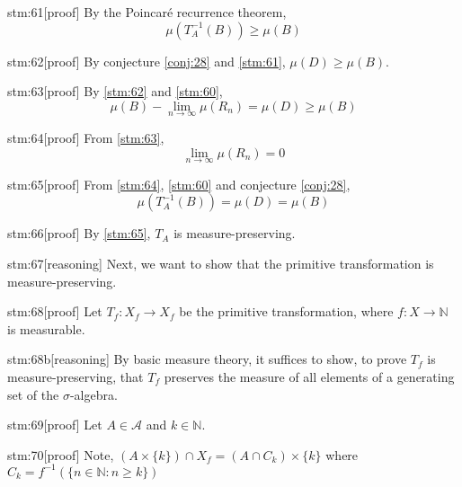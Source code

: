 \begin{stm}{stm:61}[proof]
By the Poincaré recurrence theorem, 
\[
\mu(T_A^{-1}(B)) \ge \mu(B)
\]
\end{stm}

\begin{stm}{stm:62}[proof]
By conjecture \ref{conj:28} and \ref{stm:61}, $\mu(D) \ge \mu(B)$.
\end{stm}

\begin{stm}{stm:63}[proof]
By \ref{stm:62} and \ref{stm:60}, 
\[
\mu(B) - \lim_{n \to \infty} \mu(R_n) = \mu(D) \ge \mu(B)
\]
\end{stm}

\begin{stm}{stm:64}[proof]
From \ref{stm:63}, 
\[
\lim_{n \to \infty} \mu(R_n) = 0
\]
\end{stm}

\begin{stm}{stm:65}[proof]
From \ref{stm:64}, \ref{stm:60} and conjecture \ref{conj:28},
\[
\mu(T_A^{-1}(B)) = \mu(D) = \mu(B)
\]
\end{stm}

\begin{stm}{stm:66}[proof]
By \ref{stm:65}, $T_A$ is measure-preserving.
\end{stm}

\begin{stm}{stm:67}[reasoning]
Next, we want to show that the primitive transformation is measure-preserving.
\end{stm}

\begin{stm}{stm:68}[proof]
Let $T_f : X_f \to X_f$ be the primitive transformation, where $f : X \to \mathbb{N}$ is measurable.
\end{stm}

\begin{stm}{stm:68b}[reasoning]
By basic measure theory, it suffices to show, to prove $T_f$ is measure-preserving, that $T_f$ preserves the measure of all elements of a generating set of the $\sigma$-algebra.
\end{stm}

\begin{stm}{stm:69}[proof]
Let $A \in \mathcal{A}$ and $k \in \mathbb{N}$.
\end{stm}

\begin{stm}{stm:70}[proof]
Note, $(A \times \{k\}) \cap X_f = (A \cap C_k) \times \{k\}$ where $C_k = f^{-1}(\{n \in \mathbb{N} : n \ge k\})$
\end{stm}

